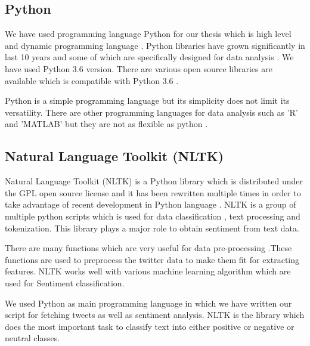 \subsection{Python}
We have used programming language Python for our thesis which is high level and  dynamic programming language . Python libraries have grown significantly in last 10 years and some of which are specifically designed for data analysis \cite{edtr2}. We have used Python 3.6 version. There are various open source libraries are available which is compatible with Python 3.6 .
\par Python is a simple programming language but its simplicity does not limit its versatility. There are other programming languages for data analysis such as 'R' and 'MATLAB' but they are not as flexible as python .
 \subsection{Natural Language Toolkit (NLTK)}
 Natural Language Toolkit (NLTK) is a Python library which is distributed under the GPL open source license and it has been rewritten multiple times in order to take advantage of recent development in Python language \cite{edtr3}. NLTK is a group of multiple python scripts which is used for data classification , text processing and tokenization. This library plays a major role to  obtain sentiment from text data.
\par There are many functions which are very useful for data pre-processing .These functions are used to preprocess the twitter  data to make them fit for extracting features. NLTK works well with various machine learning algorithm which are used for Sentiment classification.
\par We used Python as main programming language in which we have written our script for fetching tweets as well as sentiment analysis. NLTK is the library which does the most important task to classify text into either positive or negative or neutral classes.
